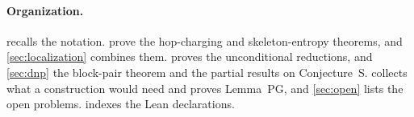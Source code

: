 \paragraph{Organization.}  recalls the notation.  prove the hop-charging and
skeleton-entropy theorems, and \cref{sec:localization} combines them.  proves the unconditional
reductions, and \cref{sec:dnp} the block-pair theorem and the partial results on Conjecture~S. 
collects what a construction would need and proves Lemma~PG, and \cref{sec:open} lists the open problems.
 indexes the Lean declarations.
